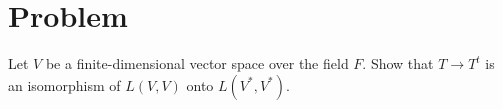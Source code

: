 \documentclass[journal,12pt,twocolumn]{IEEEtran}
\begin{document}
\section{Problem}
Let $V$ be a finite-dimensional vector space over the field $F$. Show that $T \rightarrow T^t$ is an isomorphism of $L(V,V)$ onto $L(V^*,V^*)$.
\end{document}
